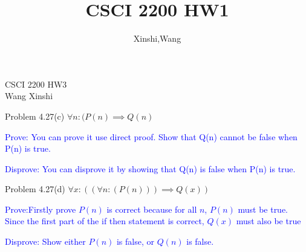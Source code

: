 \documentclass{article}
\title{CSCI 2200 HW1}
\author{Xinshi,Wang}
\begin{document}
\noindent
CSCI 2200 HW3\\
Wang Xinshi\\

\begin{addmargin}[2em]{2em}
	Problem 4.27(c) \quad $\forall n:(P(n) \implies Q(n)$
	
	\textcolor{blue}{
		Prove: You can prove it use direct proof. Show that Q(n) cannot be false when P(n) is true.}
	
	\textcolor{blue}{
		Disprove: You can disprove it by showing that Q(n) is false when P(n) is true. 
		}
	
	\noindent Problem 4.27(d) \quad $\forall x:((\forall n:(P(n))) \implies Q(x))$
	
	\textcolor{blue}{
		Prove:Firstly prove $P(n)$ is correct because for all $n$, $P(n)$ must be true. Since the first part of the if then statement is correct, $Q(x)$ must also be true}
	
	\textcolor{blue}{
		Disprove: Show either $P(n)$ is false, or $Q(n)$ is false.
	}

\end{addmargin}

\clearpage
\end{document}
